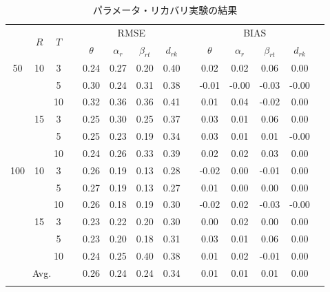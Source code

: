 \documentclass[a4paper，11pt，oneside，openany]{jsbook}
\newcommand{\bhline}[1]{\noalign{\hrule height #1}}
\begin{document}
\begin{table}[tb]
\begin{center}
\caption{パラメータ・リカバリ実験の結果}
\setlength{\tabcolsep}{5.pt}
\begin{tabular}{cccccccccccccc}  
\bhline{1pt}
\multirow{2}{*}{$J$} & \multirow{2}{*}{$R$} & \multirow{2}{*}{$T$}  && \multicolumn{4}{c}{RMSE} &&   \multicolumn{4}{c}{BIAS}  \\
\cline{5-8}\cline{10-13}
  & & & & $\theta$ & $\alpha_r$ & $\beta_{rt}$ & $d_{rk}$ &  & $\theta$ & $\alpha_r$ & $\beta_{rt}$ & $d_{rk}$ \\
\bhline{1pt}
50 & 10 & 3 & & 0.24 & 0.27 & 0.20 & 0.40 & &0.02  & 0.02 & 0.06  & 0.00 \\
   &   & 5  && 0.30 & 0.24 & 0.31 & 0.38 & &-0.01 & -0.00 & -0.03 & -0.00  \\
   &   & 10 && 0.32 & 0.36 & 0.36 & 0.41 && 0.01  & 0.04 & -0.02 & 0.00 \\
\cline{2-14}
 & 15 & 3  && 0.25 & 0.30 & 0.25 & 0.37 && 0.03 & 0.01 & 0.06 & 0.00  \\
 &  & 5  && 0.25 & 0.23 & 0.19 & 0.34 && 0.03 & 0.01 & 0.01 & -0.00  \\
 &  & 10 && 0.24 & 0.26 & 0.33 & 0.39 && 0.02 & 0.02 & 0.03 & 0.00 \\
\hline
100 & 10 & 3  && 0.26 & 0.19 & 0.13 & 0.28 && -0.02 & 0.00 & -0.01 & 0.00  \\
 &  & 5  && 0.27 & 0.19 & 0.13 & 0.27 && 0.01  & 0.00 & 0.00  & 0.00  \\
 &  & 10 && 0.26 & 0.18 & 0.19 & 0.30 && -0.02 & 0.02 & -0.03 & -0.00 \\
\cline{2-14}
 & 15 & 3  && 0.23 & 0.22 & 0.20 & 0.30 && 0.00 & 0.02 & 0.00 &0.00 \\
 &  & 5  && 0.23 & 0.20 & 0.18 & 0.31 && 0.03 & 0.01 & 0.06  &0.00\\
 &  & 10 && 0.24 & 0.25 & 0.40 & 0.38 && 0.01 & 0.02 & -0.01 &0.00\\
\hline
\multicolumn{4}{c}{Avg.}   &  0.26 & 0.24 & 0.24 & 0.34 &  & 0.01 & 0.01 & 0.01 & 0.00 & \\
\bhline{1pt}
\end{tabular}
\label{parameters_recovery}
\end{center}
\end{table}
\end{document}
